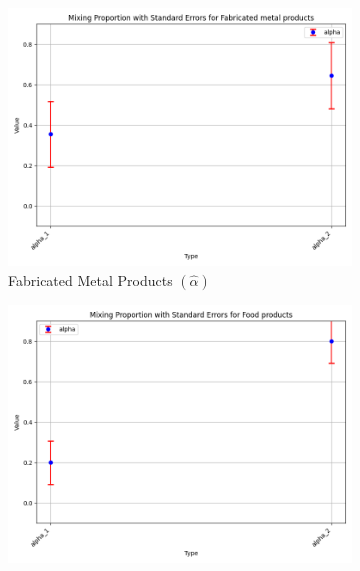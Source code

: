 \documentclass{article}
\begin{document}
\begin{figure}[ht!]
    \centering 
    \caption{I.I.D 3-Component Mixture Model with $\log K$, Import and CIIU}
    \begin{subfigure}[t]{0.32\textwidth}
        \centering
        \includegraphics[width=\textwidth]{figure/empirical_stat_mixture_kmshare_ciiu_alpha_with_error_bars_Fabricated metal products.png}
        \caption{Fabricated Metal Products $(\hat\alpha)$}
    \end{subfigure}
    \begin{subfigure}[t]{0.32\textwidth}
        \centering
        \includegraphics[width=\textwidth]{figure/empirical_stat_mixture_kmshare_ciiu_alpha_with_error_bars_Food products.png}

\end{subfigure}
\end{figure}
\end{document}
